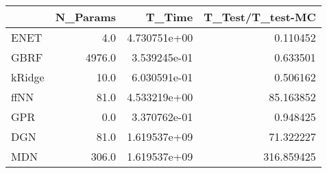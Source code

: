 \begin{tabular}{lrrr}
\toprule
{} &  N\_Params &        T\_Time &  T\_Test/T\_test-MC \\
\midrule
ENET   &       4.0 &  4.730751e+00 &          0.110452 \\
GBRF   &    4976.0 &  3.539245e-01 &          0.633501 \\
kRidge &      10.0 &  6.030591e-01 &          0.506162 \\
ffNN   &      81.0 &  4.533219e+00 &         85.163852 \\
GPR    &       0.0 &  3.370762e-01 &          0.948425 \\
DGN    &      81.0 &  1.619537e+09 &         71.322227 \\
MDN    &     306.0 &  1.619537e+09 &        316.859425 \\
\bottomrule
\end{tabular}
